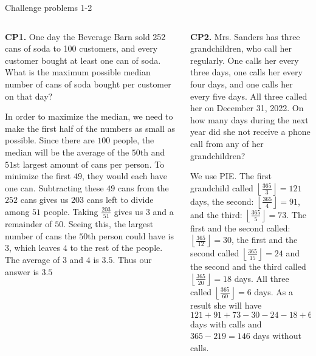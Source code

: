 \documentclass[9pt,aspectratio=169]{beamer}
\begin{document}
\begin{frame}{Challenge problems 1-2}
  \begin{columns}[T]
    \begin{column}{0.5\textwidth}
      \begin{problem}
        \textbf{CP1.} One day the Beverage Barn sold 252 cans of soda to 100 customers, and every customer bought at least one can of soda. What is the maximum possible median number of cans of soda bought per customer on that day?
      \end{problem}
      In order to maximize the median, we need to make the first half of the numbers as small as possible. Since there are $100$ people, the median will be the average of the $50\text{th}$ and $51\text{st}$ largest amount of cans per person. To minimize the first $49$, they would each have one can. Subtracting these $49$ cans from the $252$ cans gives us $203$ cans left to divide among $51$ people. Taking $\frac{203}{51}$ gives us $3$ and a remainder of $50$. Seeing this, the largest number of cans the $50$th person could have is $3$, which leaves $4$ to the rest of the people. The average of $3$ and $4$ is $3.5$. Thus our answer is $\boxed{3.5}$
    \end{column}
    \begin{column}{0.5\textwidth}
      \begin{problem}
        \textbf{CP2.} Mrs. Sanders has three grandchildren, who call her regularly. One calls her every three days, one calls her every four days, and one calls her every five days. All three called her on December 31, 2022. On how many days during the next year did she not receive a phone call from any of her grandchildren?
      \end{problem}
      We use PIE. The first grandchild called $\left\lfloor\frac{365}{3}\right\rfloor = 121$ days, the second: $\left\lfloor\frac{365}{4}\right\rfloor = 91$, and the third: $\left\lfloor\frac{365}{5}\right\rfloor = 73$. The first and the second called: $\left\lfloor\frac{365}{12}\right\rfloor = 30$, the first and the second called $\left\lfloor\frac{365}{15}\right\rfloor = 24$ and the second and the third called $\left\lfloor\frac{365}{20}\right\rfloor = 18$ days. All three called $\left\lfloor\frac{365}{60}\right\rfloor = 6$ days. As a result she will have $121 + 91 + 73 - 30 - 24 - 18 + 6 = 219$ days with calls and $365 - 219 = \boxed{146}$ days without calls.
    \end{column}
  \end{columns}
\end{frame}
\end{document}
